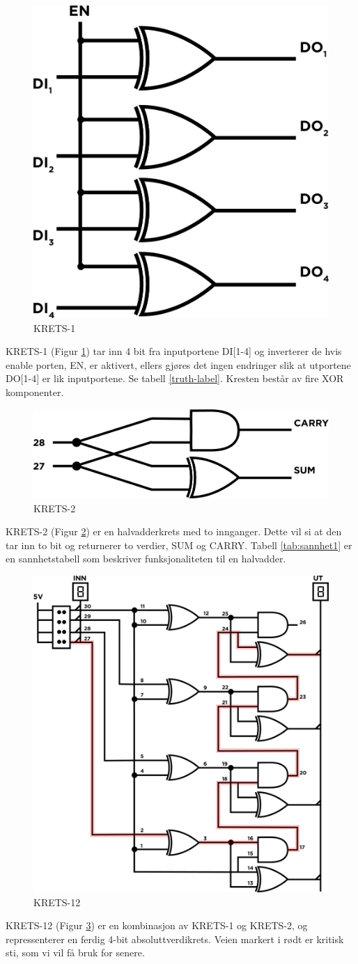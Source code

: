\documentclass{article}
\begin{document}
\begin{figure}[H]
	\centering
	\includegraphics[width=0.2\linewidth]{krets1}
	\caption{KRETS-1}
	\label{fig:KRETS-1}
\end{figure}

KRETS-1 (Figur \ref{fig:KRETS-1}) tar inn 4 bit fra inputportene DI[1-4] og inverterer de hvis enable porten, EN, er aktivert, ellers gjøres det ingen endringer slik at utportene DO[1-4] er lik inputportene. Se tabell \ref{truth-label}. Kresten består av fire XOR komponenter.

\begin{figure}[H]
	\centering
	\includegraphics[width=0.4\linewidth]{krets2}
	\caption{KRETS-2}
	\label{fig:KRETS-2}
\end{figure}

KRETS-2 (Figur \ref{fig:KRETS-2}) er en halvadderkrets med to innganger. Dette vil si at den tar inn to bit og returnerer to verdier, SUM og CARRY. Tabell \ref{tab:sannhet1} er en sannhetstabell som beskriver funksjonaliteten til en halvadder.

\begin{figure}[H]
	\centering
	\includegraphics[width=0.5\linewidth]{krets12}
	\caption{KRETS-12}
	\label{fig:KRETS-12}
\end{figure}

KRETS-12 (Figur \ref{fig:KRETS-12}) er en kombinasjon av KRETS-1 og KRETS-2, og repressenterer en ferdig 4-bit absoluttverdikrets. Veien markert i rødt er kritisk sti, som vi vil få bruk for senere.
\end{document}

